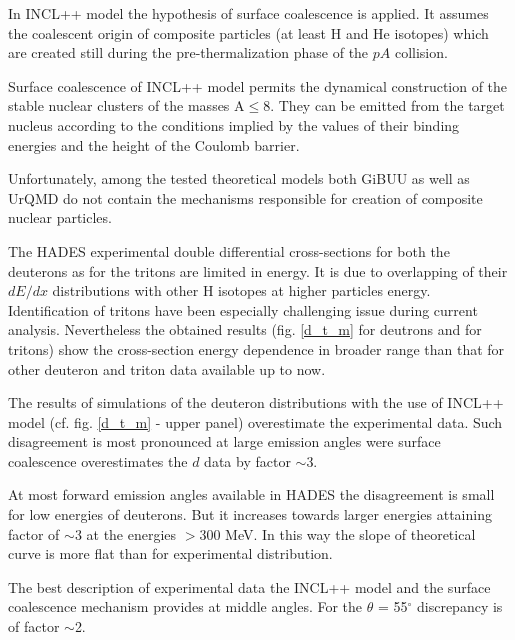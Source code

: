 In INCL++ model the hypothesis of surface coalescence is applied.
It assumes the coalescent origin of composite particles (at least H and He isotopes) which are created still during the pre-thermalization phase of the $pA$ collision. 

Surface coalescence of INCL++ model permits the  dynamical construction of the stable nuclear clusters of the masses A$\le$8. They can be emitted from the target nucleus according to
the conditions implied by the values of their  binding energies and the height of the Coulomb barrier. 

Unfortunately, among the tested theoretical models both GiBUU as well as UrQMD do
not contain the mechanisms responsible for creation of composite nuclear particles.

The HADES experimental double differential cross-sections for both the deuterons as for the tritons are limited in energy. It is due to overlapping of their $dE/dx$ distributions with other H isotopes at higher particles energy. 
Identification of tritons have been especially challenging issue during current analysis.
Nevertheless the obtained results (fig. \ref{d_t_m} for deutrons and for tritons) show the cross-section energy dependence in broader range than that for other 
deuteron and triton data available up to now. 






The results of simulations of the deuteron distributions with the use of INCL++ model (cf. fig. \ref{d_t_m} - upper panel) overestimate the experimental data. Such disagreement is most pronounced at large emission angles were surface coalescence overestimates the $d$ data by factor $\sim$3. 

At most forward emission angles available in HADES the disagreement is small for low energies of deuterons. But it increases towards larger energies attaining factor of $\sim$3 at the energies $>$300 MeV. In this way the slope of theoretical curve is more flat than for experimental distribution.

The best description of experimental data the INCL++ model and the surface coalescence mechanism provides at middle angles.
For the $\theta$ = 55$^{\circ}$
discrepancy is of factor $\sim$2.


